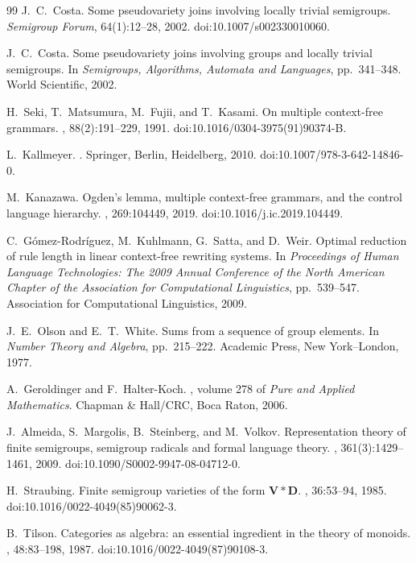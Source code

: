 \documentclass[11pt]{article}
\numberwithin{equation}{section}
\theoremstyle{plain}
\theoremstyle{definition}
\theoremstyle{remark}
\theoremstyle{plain}
\begin{document}
\begin{thebibliography}{99}
J.~C.~Costa.
\newblock Some pseudovariety joins involving locally trivial semigroups.
\newblock \emph{Semigroup Forum}, 64(1):12--28, 2002.
\newblock doi:10.1007/s002330010060.

J.~C.~Costa.
\newblock Some pseudovariety joins involving groups and locally trivial semigroups.
\newblock In \emph{Semigroups, Algorithms, Automata and Languages},
pp.~341--348. World Scientific, 2002.

H.~Seki, T.~Matsumura, M.~Fujii, and T.~Kasami.
\newblock On multiple context-free grammars.
, 88(2):191--229, 1991.
\newblock doi:10.1016/0304-3975(91)90374-B.

L.~Kallmeyer.
.
\newblock Springer, Berlin, Heidelberg, 2010.
\newblock doi:10.1007/978-3-642-14846-0.

M.~Kanazawa.
\newblock Ogden's lemma, multiple context-free grammars, and the control language hierarchy.
, 269:104449, 2019.
\newblock doi:10.1016/j.ic.2019.104449.

C.~G\'omez-Rodr\'iguez, M.~Kuhlmann, G.~Satta, and D.~Weir.
\newblock Optimal reduction of rule length in linear context-free rewriting systems.
\newblock In {\em Proceedings of Human Language Technologies: The 2009 Annual
Conference of the North American Chapter of the Association for Computational
Linguistics}, pp.~539--547. Association for Computational Linguistics, 2009.

J.~E.~Olson and E.~T.~White.
\newblock Sums from a sequence of group elements.
\newblock In \emph{Number Theory and Algebra}, pp.~215--222.
Academic Press, New York--London, 1977.

A.~Geroldinger and F.~Halter-Koch.
, volume 278 of {\em Pure and Applied Mathematics}.
\newblock Chapman \& Hall/CRC, Boca Raton, 2006.

J.~Almeida, S.~Margolis, B.~Steinberg, and M.~Volkov.
\newblock Representation theory of finite semigroups, semigroup radicals and
formal language theory.
,
361(3):1429--1461, 2009.
\newblock doi:10.1090/S0002-9947-08-04712-0.

H.~Straubing.
\newblock Finite semigroup varieties of the form $\mathbf V*\mathbf D$.
, 36:53--94, 1985.
\newblock doi:10.1016/0022-4049(85)90062-3.

B.~Tilson.
\newblock Categories as algebra: an essential ingredient in the theory of monoids.
, 48:83--198, 1987.
\newblock doi:10.1016/0022-4049(87)90108-3.

\end{thebibliography}
\normalsize
\end{document}
